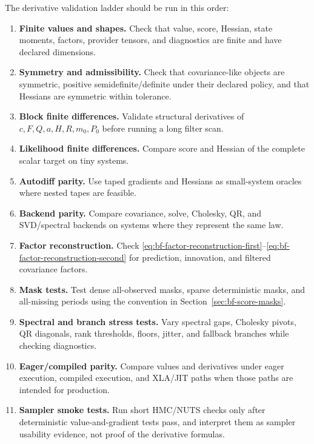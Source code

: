 The derivative validation ladder should be run in this order:
\begin{enumerate}[label=(\roman*)]
  \item \textbf{Finite values and shapes.}
    Check that value, score, Hessian, state moments, factors, provider tensors,
    and diagnostics are finite and have declared dimensions.
  \item \textbf{Symmetry and admissibility.}
    Check that covariance-like objects are symmetric, positive
    semidefinite/definite under their declared policy, and that Hessians are
    symmetric within tolerance.
  \item \textbf{Block finite differences.}
    Validate structural derivatives of $c,F,Q,a,H,R,m_0,P_0$ before running a
    long filter scan.
  \item \textbf{Likelihood finite differences.}
    Compare score and Hessian of the complete scalar target on tiny systems.
  \item \textbf{Autodiff parity.}
    Use taped gradients and Hessians as small-system oracles where nested tapes
    are feasible.
  \item \textbf{Backend parity.}
    Compare covariance, solve, Cholesky, QR, and SVD/spectral backends on
    systems where they represent the same law.
  \item \textbf{Factor reconstruction.}
    Check
    \eqref{eq:bf-factor-reconstruction-first}--\eqref{eq:bf-factor-reconstruction-second}
    for prediction, innovation, and filtered covariance factors.
  \item \textbf{Mask tests.}
    Test dense all-observed masks, sparse deterministic masks, and all-missing
    periods using the convention in Section~\ref{sec:bf-score-masks}.
  \item \textbf{Spectral and branch stress tests.}
    Vary spectral gaps, Cholesky pivots, QR diagonals, rank thresholds, floors,
    jitter, and fallback branches while checking diagnostics.
  \item \textbf{Eager/compiled parity.}
    Compare values and derivatives under eager execution, compiled execution,
    and XLA/JIT paths when those paths are intended for production.
  \item \textbf{Sampler smoke tests.}
    Run short HMC/NUTS checks only after deterministic value-and-gradient tests
    pass, and interpret them as sampler usability evidence, not proof of the
    derivative formulas.
\end{enumerate}

